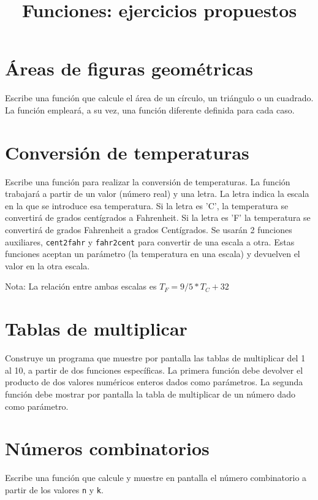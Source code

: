 \documentclass[a4paper]{article}
\date{}
\title{Funciones: ejercicios propuestos}
\begin{document}
\maketitle

\section{Áreas de figuras geométricas}
\label{sec:orgacdb165}
Escribe una función que calcule el área de un círculo, un triángulo o un cuadrado. La función empleará, a su vez, una función diferente definida para cada caso.

\section{Conversión de temperaturas}
\label{sec:org201f189}
Escribe una función para realizar la conversión de temperaturas. La función trabajará a partir de un valor (número real) y una letra. La letra indica la escala en la que se introduce esa temperatura. Si la letra es 'C', la temperatura se convertirá de grados centígrados a Fahrenheit. Si la letra es 'F' la temperatura se convertirá de grados Fahrenheit a grados Centígrados. Se usarán 2 funciones auxiliares, \texttt{cent2fahr} y \texttt{fahr2cent} para convertir de una escala a otra. Estas funciones aceptan un parámetro (la temperatura en una escala) y devuelven el valor en la otra escala. 

Nota: La relación entre ambas escalas es \(T_F = 9/5 * T_C + 32\)

\section{Tablas de multiplicar}
\label{sec:orge1565f2}
Construye un programa que muestre por pantalla las tablas de multiplicar del 1 al 10, a partir de dos funciones específicas. La primera función debe devolver el producto de dos valores numéricos enteros dados como parámetros. La segunda función debe mostrar por pantalla la tabla de multiplicar de un número dado como parámetro.

\section{Números combinatorios}
\label{sec:org6f5ecb5}

Escribe una función que calcule y muestre en pantalla el número combinatorio a partir de los valores \texttt{n} y \texttt{k}.
\end{document}
